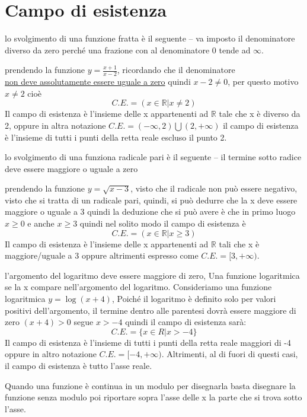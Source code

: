 \section{Campo di esistenza}
\begin{defi}
	lo svolgimento di una funzione fratta è il seguente -- va imposto il
	denominatore diverso da zero perché una frazione con al denominatore 0
	tende ad $\infty$.
	\begin{esempio}
		prendendo la funzione $y=\frac{x+1}{x-2}$, ricordando che il
		denominatore\\
		\underline{non deve assolutamente essere uguale a zero}
		quindi $x-2\neq 0$, per questo motivo $x\neq 2$ cioè
		\begin{equation}
			C.E.=(x\in \mathds{R} | x \neq 2)
		\end{equation}
		Il campo di esistenza è l'insieme delle x appartenenti ad $\mathds{R}$
		tale che x è diverso da 2, oppure in altra notazione
		$C.E.=(-\infty,2)\bigcup (2,+\infty)$ il campo di esistenza è l'insieme
		di tutti i punti della retta reale escluso il punto 2.
	\end{esempio}
\end{defi}
\begin{defi}
	lo svolgimento di una funziona radicale pari è il seguente -- il termine
	sotto radice deve essere maggiore o uguale a zero
	\begin{esempio}
		prendendo la funzione $y=\sqrt{x-3}$, visto che il radicale non può
		essere negativo, visto che si tratta di un radicale pari, quindi, si
		può dedurre che la x deve essere maggiore o uguale a 3 quindi la
		deduzione che si può avere è che in primo luogo $x\geq 0$ e anche
		$x\geq 3$ quindi nel solito modo il campo di esistenza è
		\begin{equation}
			C.E.=(x\in \mathds{R} | x\geq 3)
		\end{equation}
		Il campo di esistenza è l'insieme delle x appartenenti ad $\mathds{R}$
		tali che x è maggiore/uguale a 3 oppure altrimenti espresso come
		$C.E.=[3, +\infty)$.
	\end{esempio}
\end{defi}
\begin{defi}
	l'argomento del logaritmo deve essere maggiore di zero, Una funzione
	logaritmica se la x compare nell'argomento del logaritmo. Consideriamo una
	funzione logaritmica $y=\log(x+4)$, Poiché il logaritmo è definito solo per
	valori positivi dell'argomento, il termine dentro alle parentesi dovrà
	essere maggiore di zero $(x+4)>0$ segue $x>-4$ quindi il campo di esistenza
	sarà:
	\begin{equation}
		C.E.=\{x\in R | x>-4\}
	\end{equation}
	Il campo di esistenza è l'insieme di tutti i punti della retta reale
	maggiori di -4 oppure in altro notazione $C.E.=[-4,+\infty)$. Altrimenti,
	al di fuori di questi casi, il campo di esistenza è tutto l'asse reale.
\end{defi}
\begin{defi}
	Quando una funzione è continua in un modulo per disegnarla basta disegnare
	la funzione senza modulo poi riportare sopra l'asse delle x la parte che
	si trova sotto l'asse.
\end{defi}

